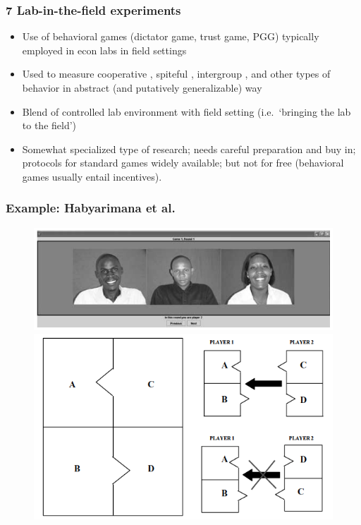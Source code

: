 \documentclass[12pt,english,dvipsnames,aspectratio=169,handout]{beamer}\usepackage[]{graphicx}\usepackage[]{xcolor}
\begin{document}
\begin{frame}
	\frametitle{7 Lab-in-the-field experiments}
	\footnotesize
\begin{itemize}
\item Use of behavioral games (dictator game, trust game, PGG) typically employed in econ labs in field settings
  \item Used to measure cooperative \cite{baldassarri_centralized_2011}, spiteful \cite{prediger_resource_2014},  intergroup \cite{abascal_us_2015}, and other types of behavior in abstract (and putatively generalizable) way
  \item Blend of controlled lab environment with field setting (i.e.\ `bringing the lab to the field') 
  \item Somewhat specialized type of research; needs careful preparation and buy in; protocols for standard games widely available; but not for free (behavioral games usually entail incentives).
\end{itemize}
\vspace{3cm}
\end{frame}


\begin{frame}
	\frametitle{Example: Habyarimana et al.\ \citeyear{habyarimana_why_2007}}
    \begin{figure}[ht]
        \begin{minipage}[b]{0.5\linewidth}
            \centering
            \includegraphics[width=\textwidth]{../04-figures/12/21-w12_coethnicity}
        \end{minipage}
        \hspace{0.5cm}
        \begin{minipage}[b]{0.5\linewidth}
            \centering
            \includegraphics[width=\textwidth]{../04-figures/12/22-w12_puzzle}
        \end{minipage}
    \end{figure}
\end{frame}
\end{document}
